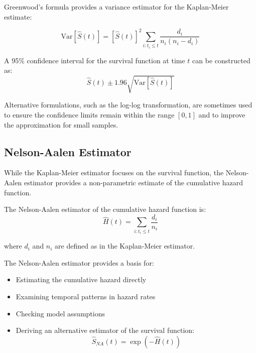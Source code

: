Greenwood's formula provides a variance estimator for the Kaplan-Meier estimate:

\begin{equationbox}[title=Greenwood's Formula]
\begin{equation}
    \text{Var}[\hat{S}(t)] = [\hat{S}(t)]^2 \sum_{i: t_i \leq t} \frac{d_i}{n_i(n_i-d_i)}
\end{equation}
\end{equationbox}

A 95\% confidence interval for the survival function at time $t$ can be constructed as:
\begin{equation}
    \hat{S}(t) \pm 1.96 \sqrt{\text{Var}[\hat{S}(t)]}
\end{equation}

Alternative formulations, such as the log-log transformation, are sometimes used to ensure the confidence limits remain within the range $[0, 1]$ and to improve the approximation for small samples.

\subsection{Nelson-Aalen Estimator}

While the Kaplan-Meier estimator focuses on the survival function, the Nelson-Aalen estimator provides a non-parametric estimate of the cumulative hazard function.

\begin{definitionbox}[title=Nelson-Aalen Estimator]
The Nelson-Aalen estimator of the cumulative hazard function is:
\begin{equation}
    \hat{H}(t) = \sum_{i: t_i \leq t} \frac{d_i}{n_i}
\end{equation}

where $d_i$ and $n_i$ are defined as in the Kaplan-Meier estimator.
\end{definitionbox}

The Nelson-Aalen estimator provides a basis for:
\begin{itemize}
    \item Estimating the cumulative hazard directly
    \item Examining temporal patterns in hazard rates
    \item Checking model assumptions
    \item Deriving an alternative estimator of the survival function:
    \begin{equation}
        \hat{S}_{NA}(t) = \exp(-\hat{H}(t))
    \end{equation}
\end{itemize}

